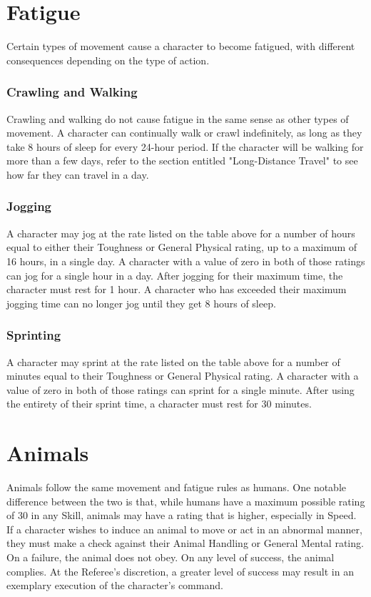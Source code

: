 \documentclass[oneside]{book}
\begin{document}
\begin{multicols}{2}
\section{Fatigue}
Certain types of movement cause a character to become fatigued, with different consequences depending on the type of action. 

\subsubsection{Crawling and Walking}
Crawling and walking do not cause fatigue in the same sense as other types of movement. A character can continually walk or crawl indefinitely, as long as they take 8 hours of sleep for every 24-hour period. If the character will be walking for more than a few days, refer to the section entitled "Long-Distance Travel" to see how far they can travel in a day.

\subsubsection{Jogging}
A character may jog at the rate listed on the table above for a number of hours equal to either their Toughness or General Physical rating, up to a maximum of 16 hours, in a single day. A character with a value of zero in both of those ratings can jog for a single hour in a day. After jogging for their maximum time, the character must rest for 1 hour. A character who has exceeded their maximum jogging time can no longer jog until they get 8 hours of sleep. 

\subsubsection{Sprinting}
A character may sprint at the rate listed on the table above for a number of minutes equal to their Toughness or General Physical rating. A character with a value of zero in both of those ratings can sprint for a single minute. After using the entirety of their sprint time, a character must rest for 30 minutes. 

\section{Animals}
Animals follow the same movement and fatigue rules as humans. One notable difference between the two is that, while humans have a maximum possible rating of 30 in any Skill, animals may have a rating that is higher, especially in Speed. If a character wishes to induce an animal to move or act in an abnormal manner, they must make a check against their Animal Handling or General Mental rating. On a failure, the animal does not obey. On any level of success, the animal complies. At the Referee's discretion, a greater level of success may result in an exemplary execution of the character's command. 


\end{multicols}
\end{document}
